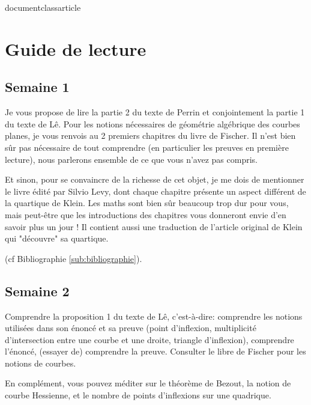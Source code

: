 documentclass{article}
\usepackage{hyperref}


\newcommand\C{\mathbb{C}}
\newcommand\R{\mathbb{R}}
\newcommand\N{\mathbb{N}}
\newcommand\D{\mathbb{D}}
\newcommand\Z{\mathbb{Z}}
\newcommand\PP{\mathbb{P}}

\section{Guide de lecture}
\label{sec:guide_de_lecture}

\subsection{Semaine 1}
\label{sub:semaine_1}

Je vous propose de lire la partie 2 du texte de Perrin
et conjointement la partie 1 du texte de Lê.
Pour les notions nécessaires de géométrie algébrique
des courbes planes, je vous renvois 
au 2 premiers chapitres du livre de Fischer.
Il n'est bien sûr pas nécessaire de tout comprendre
(en particulier les preuves en première lecture),
nous parlerons ensemble de ce que vous n'avez pas compris.

Et sinon, pour se convaincre de la richesse de cet objet,
je me dois de mentionner le livre édité par Silvio Levy,
dont chaque chapitre présente un aspect différent de la quartique
de Klein.
Les maths sont bien sûr beaucoup trop dur pour vous, mais peut-être
que les introductions des chapitres vous donneront envie d'en savoir plus un
jour !
Il contient aussi une traduction de l'article original de Klein qui "découvre"
sa quartique.

(cf Bibliographie \ref{sub:bibliographie}).

\subsection{Semaine 2}
\label{sub:semaine_2}

Comprendre la proposition 1 du texte de Lê, c'est-à-dire:
comprendre les notions utilisées dans son énoncé et sa preuve
(point d'inflexion, multiplicité d'intersection entre une courbe et une droite,
triangle d'inflexion),
comprendre l'énoncé,
(essayer de) comprendre la preuve.
Consulter le libre de Fischer pour les notions de courbes.

En complément, vous pouvez méditer sur le théorème de Bezout,
la notion de courbe Hessienne, et le nombre de points d'inflexions
sur une quadrique.

